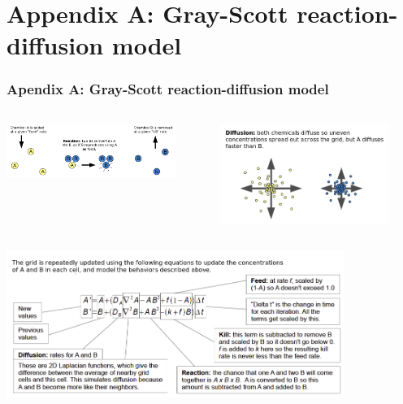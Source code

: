 \section{Appendix A: Gray-Scott reaction-diffusion model}

\begin{frame}[fragile]
  \frametitle{Apendix A: Gray-Scott reaction-diffusion model}
  \begin{columns}
    \begin{column}{0.5\textwidth}
      \includegraphics[width=5.5cm]{graphs/reaction.png}
    \end{column}
    \begin{column}{0.5\textwidth}
      \includegraphics[width=5.5cm]{graphs/diffusion.png}
    \end{column}
  \end{columns}
  \includegraphics[width=11cm]{graphs/equations.png}  
\end{frame}